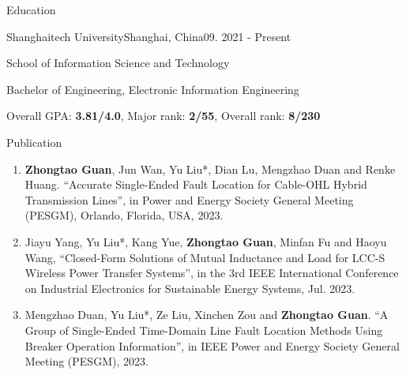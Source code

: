 \documentclass[]{ZhongtaoGuan-resume}
\begin{document}
\resumeheader
{}
{}
{}
{}
{}

\begin{section}{Education}
 \begin{subsectionnobullet}{Shanghaitech University}{Shanghai, China}{09. 2021 - Present}{}
     \item {School of Information Science and Technology}
     \item{Bachelor of Engineering, Electronic Information Engineering}
     \item{Overall GPA: \textbf{3.81/4.0}, Major rank: \textbf{2/55}, Overall rank: \textbf{8/230}}
 \end{subsectionnobullet}
\end{section}

\begin{section}{Publication}
 \begin{enumerate}
     \item \textbf{Zhongtao Guan}, Jun Wan, Yu Liu*, Dian Lu, Mengzhao Duan and Renke Huang. “Accurate Single-Ended Fault Location for Cable-OHL Hybrid Transmission Lines”, in Power and Energy Society General Meeting (PESGM), Orlando, Florida, USA, 2023. %
     \item Jiayu Yang, Yu Liu*, Kang Yue, \textbf{Zhongtao Guan}, Minfan Fu and Haoyu Wang, “Closed-Form Solutions of Mutual Inductance and Load for LCC-S Wireless Power Transfer Systems”, in the 3rd IEEE International Conference on Industrial Electronics for Sustainable Energy Systems, Jul. 2023.
     \item Mengzhao Duan, Yu Liu*, Ze Liu, Xinchen Zou and \textbf{Zhongtao Guan}. “A Group of Single-Ended Time-Domain Line Fault Location Methods Using Breaker Operation Information”, in IEEE Power and Energy Society General Meeting (PESGM), 2023.%
    \end{enumerate}
\end{section}
\end{document}
